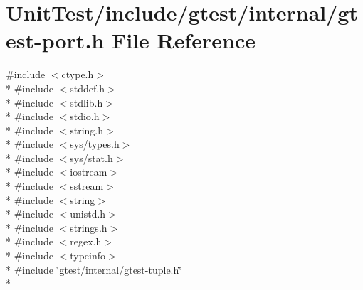 \hypertarget{gtest-port_8h}{\section{Unit\+Test/include/gtest/internal/gtest-\/port.h File Reference}
\label{gtest-port_8h}
}
{\ttfamily \#include $<$ctype.\+h$>$}\\*
{\ttfamily \#include $<$stddef.\+h$>$}\\*
{\ttfamily \#include $<$stdlib.\+h$>$}\\*
{\ttfamily \#include $<$stdio.\+h$>$}\\*
{\ttfamily \#include $<$string.\+h$>$}\\*
{\ttfamily \#include $<$sys/types.\+h$>$}\\*
{\ttfamily \#include $<$sys/stat.\+h$>$}\\*
{\ttfamily \#include $<$iostream$>$}\\*
{\ttfamily \#include $<$sstream$>$}\\*
{\ttfamily \#include $<$string$>$}\\*
{\ttfamily \#include $<$unistd.\+h$>$}\\*
{\ttfamily \#include $<$strings.\+h$>$}\\*
{\ttfamily \#include $<$regex.\+h$>$}\\*
{\ttfamily \#include $<$typeinfo$>$}\\*
{\ttfamily \#include \char`\"{}gtest/internal/gtest-\/tuple.\+h\char`\"{}}\\*
